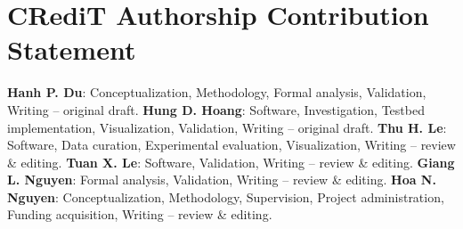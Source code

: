 \documentclass[final,5p]{elsarticle}
\begin{document}
\section*{CRediT Authorship Contribution Statement}
\textbf{Hanh P. Du}: Conceptualization, Methodology, Formal analysis, Validation, Writing -- original draft.
\textbf{Hung D. Hoang}: Software, Investigation, Testbed implementation, Visualization, Validation, Writing -- original draft.
\textbf{Thu H. Le}: Software, Data curation, Experimental evaluation, Visualization, Writing -- review \& editing.
\textbf{Tuan X. Le}: Software, Validation, Writing -- review \& editing.
\textbf{Giang L. Nguyen}: Formal analysis, Validation, Writing -- review \& editing.
\textbf{Hoa N. Nguyen}: Conceptualization, Methodology, Supervision, Project administration, Funding acquisition, Writing -- review \& editing.



\end{document}
